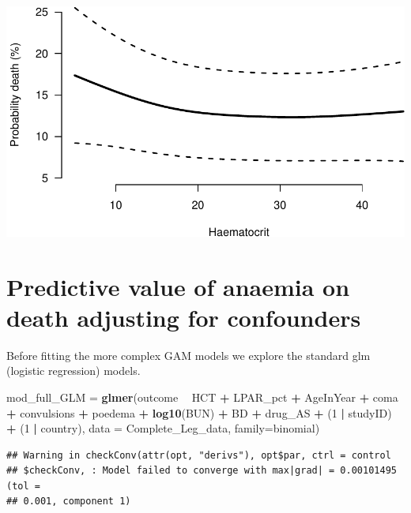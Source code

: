 \documentclass[]{article}
\newenvironment{Shaded}{\begin{snugshade}}{\end{snugshade}}
\newcommand{\KeywordTok}[1]{\textcolor[rgb]{0.13,0.29,0.53}{\textbf{#1}}}
\newcommand{\DataTypeTok}[1]{\textcolor[rgb]{0.13,0.29,0.53}{#1}}
\newcommand{\DecValTok}[1]{\textcolor[rgb]{0.00,0.00,0.81}{#1}}
\newcommand{\StringTok}[1]{\textcolor[rgb]{0.31,0.60,0.02}{#1}}
\newcommand{\OperatorTok}[1]{\textcolor[rgb]{0.81,0.36,0.00}{\textbf{#1}}}
\newcommand{\NormalTok}[1]{#1}
\begin{document}
\includegraphics{LegacyAnalysis_files/figure-latex/HCTalone-1.pdf}

\section{Predictive value of anaemia on death adjusting for
confounders}\label{predictive-value-of-anaemia-on-death-adjusting-for-confounders}

Before fitting the more complex GAM models we explore the standard glm
(logistic regression) models.

\begin{Shaded}
\begin{Highlighting}[]
\NormalTok{mod_full_GLM =}\StringTok{ }\KeywordTok{glmer}\NormalTok{(outcome }\OperatorTok{~}\StringTok{ }\NormalTok{HCT }\OperatorTok{+}\StringTok{ }\NormalTok{LPAR_pct }\OperatorTok{+}\StringTok{ }\NormalTok{AgeInYear }\OperatorTok{+}\StringTok{ }\NormalTok{coma }\OperatorTok{+}\StringTok{ }\NormalTok{convulsions }\OperatorTok{+}
\StringTok{                       }\NormalTok{poedema }\OperatorTok{+}\StringTok{ }\KeywordTok{log10}\NormalTok{(BUN) }\OperatorTok{+}\StringTok{ }\NormalTok{BD }\OperatorTok{+}\StringTok{ }\NormalTok{drug_AS }\OperatorTok{+}\StringTok{ }
\StringTok{                       }\NormalTok{(}\DecValTok{1} \OperatorTok{|}\StringTok{ }\NormalTok{studyID) }\OperatorTok{+}\StringTok{ }\NormalTok{(}\DecValTok{1} \OperatorTok{|}\StringTok{ }\NormalTok{country),}
                     \DataTypeTok{data =}\NormalTok{ Complete_Leg_data, }\DataTypeTok{family=}\NormalTok{binomial)}
\end{Highlighting}
\end{Shaded}

\begin{verbatim}
## Warning in checkConv(attr(opt, "derivs"), opt$par, ctrl = control
## $checkConv, : Model failed to converge with max|grad| = 0.00101495 (tol =
## 0.001, component 1)
\end{verbatim}
\end{document}
